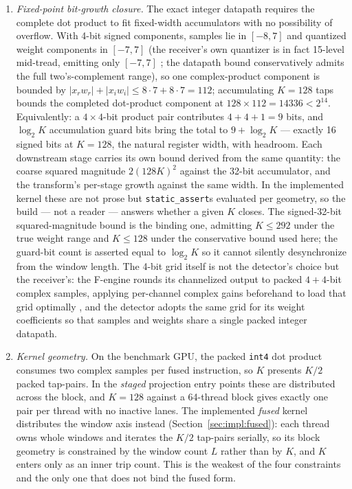 \begin{enumerate}
\begin{enumerate}
admits a tolerance-selected operating point in Section~\ref{sec:tolerance:thresholds}, and the imperfectly-served minority structure lies on channels whose verdicts do not hinge on it. Figure~\ref{fig:param:geometry} draws the resulting geometry once, in the two coordinates the rest of the dissertation uses.
        \item \emph{Fixed-point bit-growth closure.} The exact integer datapath requires the complete dot product to fit fixed-width accumulators with no possibility of overflow. With 4-bit signed components, samples lie in $[-8, 7]$ and quantized weight components in $[-7, 7]$ (the receiver's own quantizer is in fact 15-level mid-tread, emitting only $[-7, 7]$ \cite{menaparra2018}; the datapath bound conservatively admits the full two's-complement range), so one complex-product component is bounded by $|x_r w_r| + |x_i w_i| \le 8 \cdot 7 + 8 \cdot 7 = 112$; accumulating $K = 128$ taps bounds the completed dot-product component at $128 \times 112 = 14336 < 2^{14}$. Equivalently: a $4{\times}4$-bit product pair contributes $4 + 4 + 1 = 9$ bits, and $\log_2 K$ accumulation guard bits bring the total to $9 + \log_2 K$ --- exactly 16 signed bits at $K = 128$, the natural register width, with headroom. Each downstream stage carries its own bound derived from the same quantity: the coarse squared magnitude $2(128K)^2$ against the 32-bit accumulator, and the transform's per-stage growth against the same width. In the implemented kernel these are not prose but \texttt{static\_assert}s evaluated per geometry, so the build --- not a reader --- answers whether a given $K$ closes. The signed-32-bit squared-magnitude bound is the binding one, admitting $K \le 292$ under the true weight range and $K \le 128$ under the conservative bound used here; the guard-bit count is asserted equal to $\log_2 K$ so it cannot silently desynchronize from the window length. The 4-bit grid itself is not the detector's choice but the receiver's: the F-engine rounds its channelized output to packed $4{+}4$-bit complex samples, applying per-channel complex gains beforehand to load that grid optimally \cite{amiri2022chime,menaparra2018}, and the detector adopts the same grid for its weight coefficients so that samples and weights share a single packed integer datapath.
        \item \emph{Kernel geometry.} On the benchmark GPU, the packed \texttt{int4} dot product consumes two complex samples per fused instruction, so $K$ presents $K/2$ packed tap-pairs. In the \emph{staged} projection entry points these are distributed across the block, and $K = 128$ against a 64-thread block gives exactly one pair per thread with no inactive lanes. The implemented \emph{fused} kernel distributes the window axis instead (Section~\ref{sec:impl:fused}): each thread owns whole windows and iterates the $K/2$ tap-pairs serially, so its block geometry is constrained by the window count $L$ rather than by $K$, and $K$ enters only as an inner trip count. This is the weakest of the four constraints and the only one that does not bind the fused form.

\end{enumerate}
\end{enumerate}
